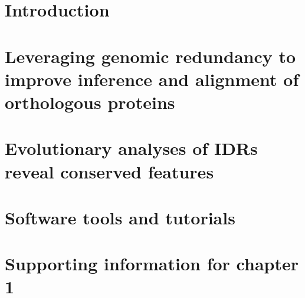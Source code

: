 \documentclass[11pt,letterpaper,oneside]{book}
\begin{document}
\tableofcontents

\setcounter{chapter}{-1}  %
\chapter{Introduction}
\graphicspath{{chapter0/figures/}}
\setcounter{page}{1}  %


\chapter{Leveraging genomic redundancy to improve inference and alignment of orthologous proteins}
\graphicspath{{chapter1/figures/}}


\chapter{Evolutionary analyses of IDRs reveal conserved features}


\chapter{Software tools and tutorials}


\printbibliography[heading=bibintoc]

\appendix
\setcounter{figure}{0}
\renewcommand{\thefigure}{\thechapter\arabic{figure}}
\setcounter{table}{0}
\renewcommand{\thetable}{\thechapter\arabic{table}}

\chapter{Supporting information for chapter 1}

\end{document}
